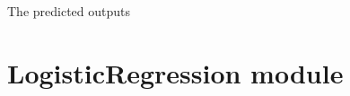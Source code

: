 \documentclass[letterpaper,10pt,english]{sphinxmanual}
\begin{document}
\begin{fulllineitems}
\begin{fulllineitems}
\begin{description}
\end{description}
\begin{description}
\sphinxAtStartPar
The predicted outputs

\end{description}

\end{fulllineitems}


\end{fulllineitems}


\sphinxstepscope


\section{LogisticRegression module}
\label{\detokenize{LogisticRegression:module-LogisticRegression}}\label{\detokenize{LogisticRegression:logisticregression-module}}\label{\detokenize{LogisticRegression::doc}}
\end{document}
